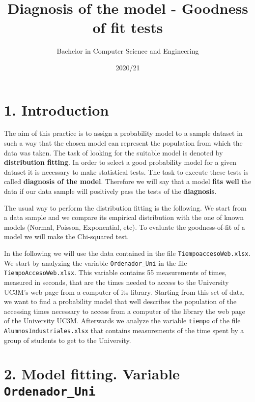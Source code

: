 \documentclass[
]{article}
\title{\textbf{Diagnosis of the model - Goodness of fit tests}}
\author{Bachelor in Computer Science and Engineering}
\date{2020/21}
\begin{document}
\maketitle

\hypertarget{introduction}{%
\section{1. Introduction}\label{introduction}}

The aim of this practice is to assign a probability model to a sample
dataset in such a way that the chosen model can represent the population
from which the data was taken. The task of looking for the suitable
model is denoted by \textbf{distribution fitting}. In order to select a
good probability model for a given dataset it is necessary to make
statistical tests. The task to execute these tests is called
\textbf{diagnosis of the model}. Therefore we will say that a model
\textbf{fits well} the data if our data sample will positively pass the
tests of the \textbf{diagnosis}.

The usual way to perform the distribution fitting is the following. We
start from a data sample and we compare its empirical distribution with
the one of known models (Normal, Poisson, Exponential, etc). To evaluate
the goodness-of-fit of a model we will make the Chi-squared test.

In the following we will use the data contained in the file
\texttt{TiempoaccesoWeb.xlsx}. We start by analyzing the variable
\texttt{Ordenador\_Uni} in the file \texttt{TiempoAccesoWeb.xlsx}. This
variable contains 55 measurements of times, measured in seconds, that
are the times needed to access to the University UC3M's web page from a
computer of its library. Starting from this set of data, we want to find
a probability model that well describes the population of the accessing
times necessary to access from a computer of the library the web page of
the University UC3M. Afterwards we analyze the variable \texttt{tiempo}
of the file \texttt{AlumnosIndustriales.xlsx} that contains measurements
of the time spent by a group of students to get to the University.

\hypertarget{model-fitting.-variable-ordenador_uni}{%
\section{\texorpdfstring{2. Model fitting. Variable
\texttt{Ordenador\_Uni}}{2. Model fitting. Variable Ordenador\_Uni}}\label{model-fitting.-variable-ordenador_uni}}
\end{document}
